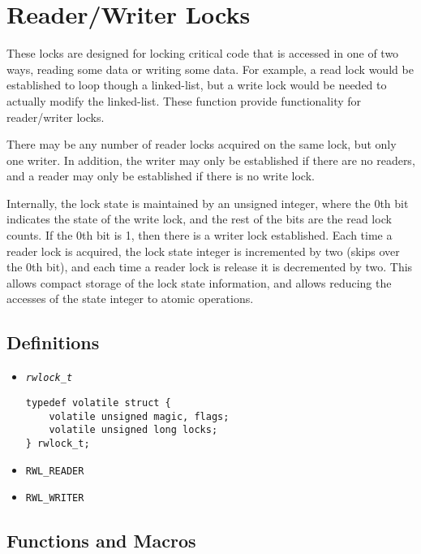 \documentclass[a4paper]{article}
\begin{document}
\section{Reader/Writer Locks}

These locks are designed for locking critical code that is accessed in one of two ways, reading
some data or writing some data. For example, a read lock would be established to loop though a 
linked-list, but a write lock would be needed to actually modify the linked-list. These function provide
functionality for reader/writer locks.

There may be any number of reader locks acquired on the same lock, but only one writer. In addition, 
the writer may only be established if there are no readers, and a reader may only be established if
there is no write lock.

Internally, the lock state is maintained by an unsigned integer, where the 0th bit indicates the 
state of the write lock, and the rest of the bits are the read lock counts. If the 0th bit is 1, then
there is a writer lock established. Each time a reader lock is acquired, the lock state integer is
incremented by two (skips over the 0th bit), and each time a reader lock is release it is decremented
by two. This allows compact storage of the lock state information, and allows reducing the accesses of
the state integer to atomic operations.

\subsection{Definitions}
\begin{itemize}
\item \texttt{\textit{rwlock\_t}} 
\begin{lstlisting}
typedef volatile struct {
	volatile unsigned magic, flags;
	volatile unsigned long locks;
} rwlock_t;
\end{lstlisting}
\item \texttt{RWL\_READER}
\item \texttt{RWL\_WRITER}
\end{itemize}


\subsection{Functions and Macros}
\end{document}
